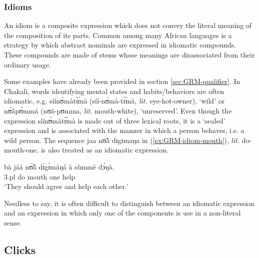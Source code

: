 \begin{exe}
\begin{exe}
\begin{exe}
{\begin{exe}
\begin{exe}
\begin{exe}
\begin{exe}
\begin{exe}
\begin{exe}
\begin{exe}
\begin{exe}
\begin{exe}
\begin{exe}
\begin{exe}
\begin{exe}
\begin{exe}
\begin{exe}
\begin{exe}
\begin{exe}
\begin{exe}
\begin{exe}
\begin{exe}
\begin{exe}
\begin{exe}
 

\subsubsection{Idioms}
\label{sec:GRM-idiom}

An idiom is a  composite expression which does not convey the literal  meaning 
of the composition  of its parts. Common among many African languages is a 
strategy by which  abstract nominals are expressed in idiomatic compounds. 
These compounds are made of stems whose meanings are disassociated from their 
ordinary usage.


Some examples have already been provided in section \ref{sec:GRM-qualifier}. In 
Chakali, words identifying mental states and habits/behaviors are often 
idiomatic, e.g. {\sls síínʊ̀màtɪ́ɪ́nà} ({síí-nʊ̀mà-tɪ́ɪ́nà}, {\it lit.} 
eye-hot-owner), `wild' or {\sls nʊ̀ã̀pʊ̀mmá} ({nʊã-pʊmma}, {\it lit.} 
mouth-white), `unreserved'. Even though the expression {\sls 
síínʊ̀màtɪ́ɪ́nà} 
is made out of three lexical roots, it is a `sealed' expression and is 
associated with the manner in which a person behaves, i.e. a wild person. The 
sequence {\sls jaa nʊ̃ã dɪgɪmaŋa} in (\ref{ex:GRM-idiom-mouth}), {\it lit.} 
do-mouth-one,  is also treated as an idiomatic expression.

\ea\label{ex:GRM-idiom-mouth}
   \gll   bà jáá nʊ̃̀ã̀ dɪ́gɪ́máŋá à sùmmè dɔ́ŋà.\\
{\sc 3.pl} do mouth one {\conn} help {\recp}\\
\glt `They should agree and help each other.'

\z

Needless to say, it is often difficult to  distinguish between an idiomatic
expression and  an expression in which only one of the  components is use in a
 non-literal sense. 
 
 
 






\subsection{Clicks}
\label{sec:GRM-greet}


\end{exe}
\end{exe}
\end{exe}
\end{exe}
\end{exe}
\end{exe}
\end{exe}
\end{exe}
\end{exe}
\end{exe}
\end{exe}
\end{exe}
\end{exe}
\end{exe}
\end{exe}
\end{exe}
\end{exe}
\end{exe}
\end{exe}
\end{exe}
\end{exe}}
\end{exe}
\end{exe}
\end{exe}

